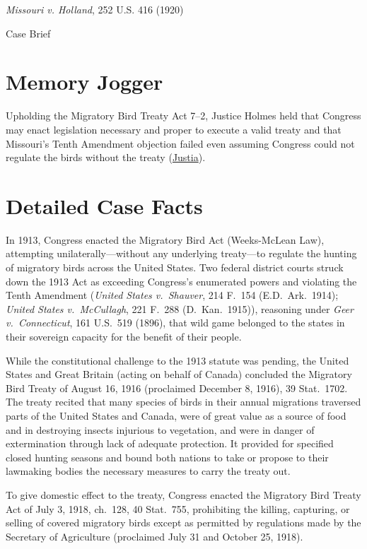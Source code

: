 \documentclass[12pt]{article}
\begin{document}
\begin{center}
{\LARGE \textit{Missouri v. Holland}, 252 U.S. 416 (1920)\par}
\vspace{0.8em}
{\large Case Brief\par}
\end{center}
\vspace{1em}

\section{Memory Jogger}
Upholding the Migratory Bird Treaty Act 7--2, Justice Holmes held that Congress may enact legislation necessary and proper to execute a valid treaty and that Missouri's Tenth Amendment objection failed even assuming Congress could not regulate the birds without the treaty (\href{https://supreme.justia.com/cases/federal/us/252/416/}{Justia}).

\section{Detailed Case Facts}
In 1913, Congress enacted the Migratory Bird Act (Weeks-McLean Law), attempting unilaterally---without any underlying treaty---to regulate the hunting of migratory birds across the United States. Two federal district courts struck down the 1913 Act as exceeding Congress's enumerated powers and violating the Tenth Amendment (\textit{United States v.\ Shauver}, 214 F.\ 154 (E.D.\ Ark.\ 1914); \textit{United States v.\ McCullagh}, 221 F.\ 288 (D.\ Kan.\ 1915)), reasoning under \textit{Geer v.\ Connecticut}, 161 U.S.\ 519 (1896), that wild game belonged to the states in their sovereign capacity for the benefit of their people.

While the constitutional challenge to the 1913 statute was pending, the United States and Great Britain (acting on behalf of Canada) concluded the Migratory Bird Treaty of August 16, 1916 (proclaimed December 8, 1916), 39 Stat.\ 1702. The treaty recited that many species of birds in their annual migrations traversed parts of the United States and Canada, were of great value as a source of food and in destroying insects injurious to vegetation, and were in danger of extermination through lack of adequate protection. It provided for specified closed hunting seasons and bound both nations to take or propose to their lawmaking bodies the necessary measures to carry the treaty out.

To give domestic effect to the treaty, Congress enacted the Migratory Bird Treaty Act of July 3, 1918, ch.\ 128, 40 Stat.\ 755, prohibiting the killing, capturing, or selling of covered migratory birds except as permitted by regulations made by the Secretary of Agriculture (proclaimed July 31 and October 25, 1918).
\end{document}
